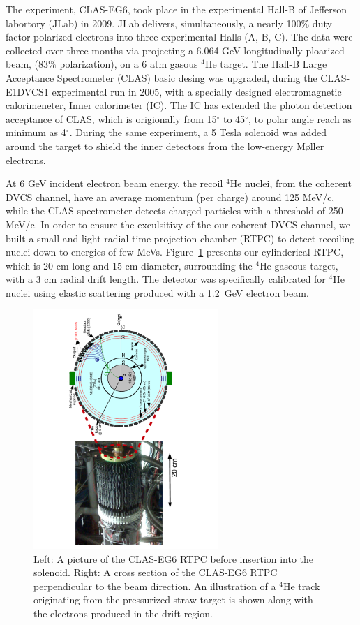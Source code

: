 \documentclass[nofootinbib,twocolumn,showpacs,prl,superscriptaddress,secnumarabic,amssymb,nobibnotes,aps,floatfix]{revtex4}
\begin{document}

The experiment, CLAS-EG6, took place in the experimental Hall-B of Jefferson 
labortory (JLab) in 2009. JLab delivers, simultaneously, a nearly 100\% duty 
factor polarized electrons into three experimental Halls (A, B, C). The data 
were collected over three months via projecting a 6.064 GeV longitudinally 
ploarized beam, (83$\%$ polarization), on a 6 atm gasous $^4$He target.  The 
Hall-B Large Acceptance Spectrometer (CLAS) basic desing \cite{CLAS_ref} was 
upgraded, during the CLAS-E1DVCS1 experimental run \cite{Girod:2007aa} in 2005, 
with a specially designed electromagnetic calorimeneter, Inner calorimeter 
(IC). The IC has extended the photon detection acceptance of CLAS, which is 
origionally from 15$^{\circ}$ to 45$^{\circ}$, to polar angle reach as minimum 
as 4$^{\circ}$. During the same experiment, a 5 Tesla solenoid was added around 
the target to shield the inner detectors from the low-energy M\o ller 
electrons.

At 6 GeV incident electron beam energy, the recoil $^4$He nuclei, from the 
coherent DVCS channel, have an average momentum (per charge) around 125 MeV/c, 
while the CLAS spectrometer detects charged particles with a threshold of 250 
MeV/c. In order to ensure the exculsitivy of the our coherent DVCS channel, we 
built a small and light radial time projection chamber (RTPC) to detect 
recoiling nuclei down to energies of few MeVs. Figure~\ref{fig:RTPC} presents 
our cylinderical RTPC, which is 20 cm long and 15 cm diameter, surrounding the 
$^4$He gaseous target, with a 3 cm radial drift length. The detector was 
specifically calibrated for $^4$He nuclei using elastic scattering produced 
with a 1.2~GeV electron beam.



\begin{figure}[tb]
\includegraphics[width=7.0cm,angle=-90]{figs/RTPC.pdf}
\vspace{-0.9cm}
\caption{Left: A picture of the CLAS-EG6 RTPC before insertion into the 
   solenoid.  Right: A cross section of the CLAS-EG6 RTPC perpendicular to the 
beam direction. An illustration of a $^4$He track originating from the 
pressurized straw target is shown along with the electrons produced in the 
drift region.}
\label{fig:RTPC}
\end{figure}
\end{document}
